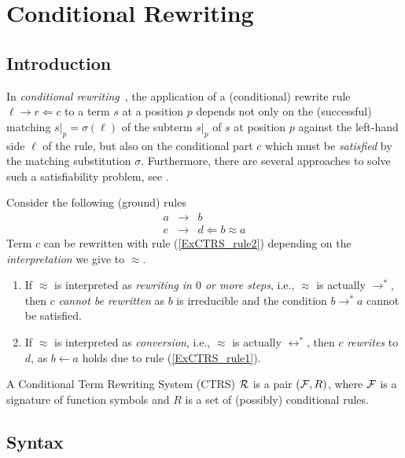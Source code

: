 \chapter{Conditional Rewriting}\label{chap:CTRS}

\section{Introduction}

In \emph{conditional rewriting}~\cite{kaplan1984ConditionalRewriteRules}, the application of a (conditional) rewrite rule $\ell\to r\Leftarrow c$ to a term $s$ at a position $p$ depends not only on the (successful) matching $s|_p=\sigma(\ell)$ of the subterm $s|_p$ of $s$ at position $p$ against the left-hand side $\ell$ of the rule, but also on the conditional part $c$ which must be \emph{satisfied} by the matching substitution $\sigma$.
%
Furthermore, there are several approaches to solve such a satisfiability problem, see \cite[Chapter~7]{ohlebusch2002AdvancedTopicsTerm}.
%
\begin{example}
Consider the following  (ground) rules
\begin{eqnarray}
a & \to & b\label{ExCTRS_rule1}
\\
c & \to & d \Leftarrow b \approx a\label{ExCTRS_rule2}
\end{eqnarray}
%
Term $c$ can be rewritten with rule (\ref{ExCTRS_rule2}) depending on the \emph{interpretation} we give to $\approx$.
\begin{enumerate}
\item If $\approx$ is interpreted as \emph{rewriting in $0$ or more steps}, i.e., $\approx$ is actually $\to^*$, then $c$ \emph{cannot be rewritten} as $b$ is irreducible and the condition $b\to^*a$ cannot be satisfied.
 \item If $\approx$ is interpreted as \emph{conversion}, i.e., $\approx$ is actually $\leftrightarrow^*$, then $c$ \emph{rewrites} to $d$, as $b\leftarrow a$ holds due to rule (\ref{ExCTRS_rule1}).
\end{enumerate}
\end{example}
%
A Conditional Term Rewriting System (CTRS) ${\cal R}$ is a pair $({\cal F},R)$, where ${\cal F}$ is a signature of function symbols and $R$ is a set of (possibly) conditional rules.


\section{Syntax}

